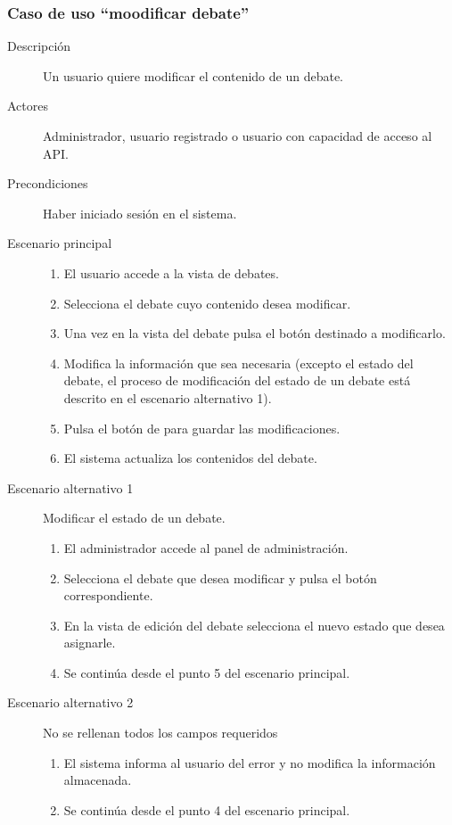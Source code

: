 \subsubsection{Caso de uso ``moodificar debate''}
\begin{description}
\item[Descripción] Un usuario quiere modificar el contenido de un debate.
\item[Actores] Administrador, usuario registrado o usuario con capacidad de acceso al API.
\item[Precondiciones] Haber iniciado sesión en el sistema.
\item[Escenario principal] \hfill
						 	\begin{enumerate}
							\item El usuario accede a la vista de debates.
							\item Selecciona el debate cuyo contenido desea modificar.
							\item Una vez en la vista del debate pulsa el botón destinado a modificarlo.
							\item Modifica la información que sea necesaria (excepto el estado del debate, el proceso de modificación del estado de un debate está descrito en el escenario alternativo 1).
							\item Pulsa el botón de para guardar las modificaciones.
							\item El sistema actualiza los contenidos del debate.
							\end{enumerate}
\item[Escenario alternativo 1]  Modificar el estado de un debate.
							\begin{enumerate}
							\item El administrador accede al panel de administración.
							\item Selecciona el debate que desea modificar y pulsa el botón correspondiente.
							\item En la vista de edición del debate selecciona el nuevo estado que desea asignarle.
							\item Se continúa desde el punto 5 del escenario principal.
							\end{enumerate}
\item[Escenario alternativo 2]  No se rellenan todos los campos requeridos
							\begin{enumerate}
							\item El sistema informa al usuario del error y no modifica la información almacenada.
							\item Se continúa desde el punto 4 del escenario principal.
							\end{enumerate}
\end{description}


